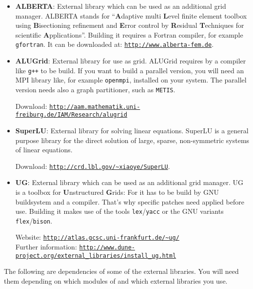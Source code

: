 \begin{itemize}
\item \textbf{ALBERTA}: External library which can be used as an
  additional grid manager. ALBERTA stands for ``\textbf{A}daptive multi \textbf{L}evel finite element toolbox
  using \textbf{B}isectioning refinement and \textbf{E}rror control by \textbf{R}esidual
  \textbf{T}echniques for scientific \textbf{A}pplications''. Building it requires a
  Fortran compiler, for example \texttt{gfortran}. It can be downloaded at:
  \texttt{\url{http://www.alberta-fem.de}}.

\item \textbf{ALUGrid}: External library for use as grid. ALUGrid
  requires by a \Cplusplus compiler like \texttt{g++} to be build. If
  you want to build a parallel version, you will need an MPI library
  like, for example \texttt{openmpi}, installed on your system. The
  parallel version needs also a graph partitioner, such as
  \texttt{METIS}.

  Download:
  \texttt{\url{http://aam.mathematik.uni-freiburg.de/IAM/Research/alugrid}}

\item \textbf{SuperLU}: External library for solving linear
  equations. SuperLU is a general purpose library for the direct
  solution of large, sparse, non-symmetric systems of linear
  equations.

  Download:
  \texttt{\url{http://crd.lbl.gov/~xiaoye/SuperLU}}.

\item \textbf{UG}: External library which can be used as an additional
  grid manager. UG is a toolbox for \textbf{U}nstructured
  \textbf{G}rids: For \eWoms it has to be build by GNU buildsystem and
  a \Cplusplus compiler. That's why \Dune specific patches need
  applied before use. Building it makes use of the tools
  \texttt{lex}/\texttt{yacc} or the GNU variants
  \texttt{flex}/\texttt{bison}.

  Website:
  \texttt{\url{http://atlas.gcsc.uni-frankfurt.de/~ug/}}\\
  Further information:
  \texttt{\url{http://www.dune-project.org/external_libraries/install_ug.html}}\\

\end{itemize}

The following are dependencies of some of the external libraries. You
will need them depending on which modules of \Dune and which external
libraries you use.

